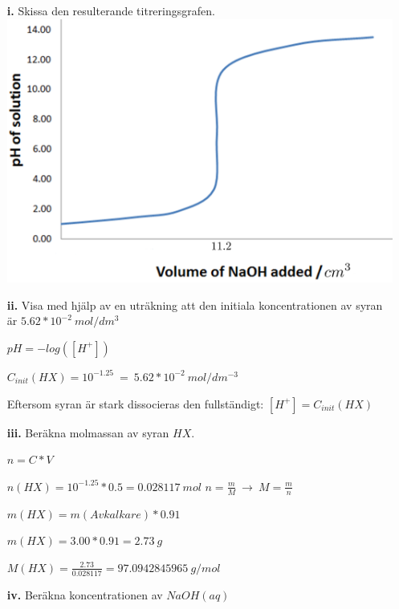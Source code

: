 \documentclass[12pt, letterpaper, twoside]{article}
\begin{document}
\begin{flushleft}
\begin{itemize}
\begin{addmargin}[1em]{2em}
\end{addmargin}
\hfill
\item[\textbf{i.}] Skissa den resulterande titreringsgrafen.
\includegraphics[scale=0.07]{ph_curve}
\hfill
\item[\textbf{ii.}] Visa med hjälp av en uträkning att den initiala koncentrationen av syran är $ 5.62*10^{-2}\ mol/dm^3 $

$ pH=-log([H^+]) $

$ C_{init}(HX)=10^{-1.25}\ =\ 5.62*10^{-2}\ mol/dm^{-3} $

Eftersom syran är stark dissocieras den fullständigt: $ [H^+] = C_{init}(HX) $

\pagebreak

\item[\textbf{iii.}] Beräkna molmassan av syran $ HX $.

$ n=C*V $

$ n(HX)=10^{-1.25}*0.5 = 0.028117\ mol $
\newline
\newline
$ n=\frac{m}{M}\ \rightarrow\ M=\frac{m}{n} $

$ m(HX)=m(Avkalkare)*0.91 $

$ m(HX)=3.00*0.91=2.73\ g $

$ M(HX)=\frac{2.73}{0.028117}=97.0942845965\ g/mol $

\hfill
\item[\textbf{iv.}] Beräkna koncentrationen av $ NaOH(aq) $


\end{itemize}
\end{flushleft}
\end{document}
